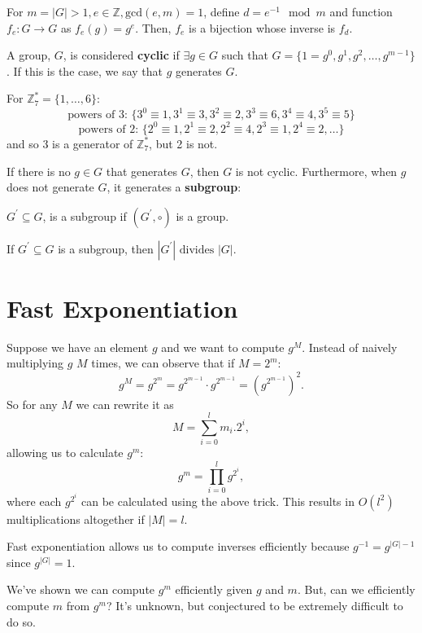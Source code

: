 \begin{corollary}
	For \(m = |G| > 1, e \in \mathbb{Z}, \text{gcd}(e, m) = 1\), define
	\(d = e^{-1} \mod m\) and function \(f_e \colon G \to G\) as \(f_e(g) = g^e\).    
	Then, \(f_e\) is a bijection whose inverse is \(f_d\).  
\end{corollary}

\begin{definition}
	A group, \(G\), is considered \textbf{cyclic} if \(\exists g \in G\) such
	that \(G = \{1 = g^0, g^1, g^2, \ldots, g^{m - 1}\}\). If this is the case,
	we say that \(g\) generates \(G\).   
\end{definition}

\begin{eg}
	For \(\mathbb{Z}_7^* = \{1, \ldots, 6\}\):
	\[
		\text{powers of 3: } \{ 3^0 \equiv 1, 3^1 \equiv 3, 3^2 \equiv 2, 3^3 \equiv 6, 3^4 \equiv 4, 3^5 \equiv 5\}
	\]
	\[
		\text{powers of 2: } \{ 2^0 \equiv 1, 2^1 \equiv 2, 2^2 \equiv 4, 2^3 \equiv 1, 2^4 \equiv 2, \ldots \}
	\]
	and so 3 is a generator of \(\mathbb{Z}_7^*\), but 2 is not.
\end{eg}

If there is no \(g \in G\) that generates \(G\), then \(G\) is not cyclic. Furthermore,
when \(g\) does not generate \(G\), it generates a \textbf{subgroup}:

\begin{definition}
	\(G^{\prime} \subseteq G\), is a subgroup if \((G^{\prime}, \circ)\) is a group.  
\end{definition}

\begin{theorem}
	If \(G^{\prime} \subseteq G\) is a subgroup, then \(|G^{\prime}|
	\text{ divides } |G|\).
\end{theorem}

\section{Fast Exponentiation}
Suppose we have an element \(g\) and we want to compute \(g^M\). Instead of
naively multiplying \(g\) \(M\) times, we can observe that if \(M = 2^m\):
\[
	g^{M} = g^{2^m} = g^{2^{m - 1}} \cdot g^{2^{m - 1}} = (g^{2^{m - 1}})^2.
\]
So for any \(M\) we can rewrite it as
\[
	M = \sum_{i = 0}^l m_i . 2^i,
\]
allowing us to calculate \(g^m\):
\[
	g^m = \prod_{i=0}^{l} g^{2^i},
\]
where each \(g^{2^i}\) can be calculated using the above trick. This
results in \(O(l^2)\) multiplications altogether if \(|M| = l\).

\begin{corollary}
	Fast exponentiation allows us to compute inverses efficiently because
	\(g^{-1} = g^{|G| - 1}\) since \(g^{|G|} = 1\).  
\end{corollary}

We've shown we can compute \(g^m\) efficiently given \(g\) and \(m\). But,
can we efficiently compute \(m\) from \(g^m\)? It's unknown, but conjectured
to be extremely difficult to do so.     